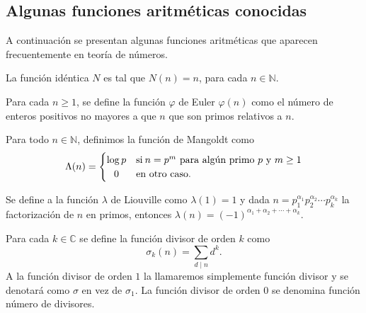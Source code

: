 \newpage
\subsection{Algunas funciones aritméticas conocidas}

A continuación se presentan algunas funciones aritméticas que aparecen frecuentemente en teoría de números.

\begin{definition}
La función idéntica $N$ es tal que $N(n)=n$, para cada $n\in \mathbb{N}$.
\end{definition}

\begin{definition}
Para cada $n\geq 1$, se define la función $\varphi$ de Euler $\varphi(n)$ como el número de enteros positivos no mayores a que $n$ que son primos relativos a $n$.
\end{definition}

\begin{definition}
Para todo $n\in\mathbb{N}$, definimos la función de Mangoldt como 
\begin{equation*}
	\Lambda(n) =
		\begin{cases}
			\log p & \text{si} \: n=p^m \text{ para algún primo } p \text{ y } m\geq 1\\ \hfil
			0 & \text{en otro caso}.
		\end{cases}
\end{equation*}
\end{definition}

\begin{definition}
Se define a la función $\lambda$ de Liouville como $\lambda(1)=1$ y dada $n=p_1^{\alpha_1}p_2^{\alpha_2}\cdots p_k^{\alpha_k}$ la factorización de $n$ en primos, entonces $\lambda(n)=(-1)^{\alpha_1+\alpha_2+\cdots+\alpha_k}$.
\end{definition}

\begin{definition}
Para cada $k\in\mathbb{C}$ se define la función divisor de orden $k$ como 
\begin{equation*}
	\sigma_k(n)=\sum_{d \mid n} d^k.
\end{equation*}
A la función divisor de orden $1$ la llamaremos simplemente función divisor y se denotará como $\sigma$ en vez de $\sigma_1$. La función divisor de orden $0$ se denomina función número de divisores.
\end{definition}

